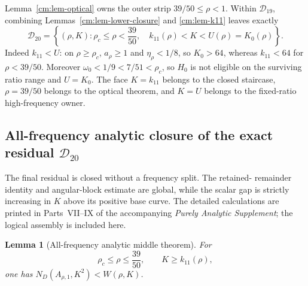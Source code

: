 \documentclass[11pt]{article}
\numberwithin{equation}{section}
\newtheorem{lemma}[theorem]{Lemma}
\theoremstyle{definition}
\theoremstyle{remark}
\begin{document}
\iffalse
Lemma~\ref{cm:lem-optical} owns the outer strip
\(39/50\leq\rho<1\).  Within \(\mathcal D_{19}\), combining
Lemmas~\ref{cm:lem-lower-closure} and \ref{cm:lem-k11} leaves exactly
\begin{equation}
 \boxed{
 \mathcal D_{20}=
 \left\{(\rho,K):\rho_c\leq\rho<\frac{39}{50},\quad
 k_{11}(\rho)<K<U(\rho)=K_0(\rho)\right\}.}
 \label{cm:eq-D20}
\end{equation}
Indeed \(k_{11}<U\): on \(\rho\geq\rho_c\),
\(a_\rho\geq1\) and \(\eta_\rho<1/8\), so \(K_0>64\), whereas
\(k_{11}<64\) for \(\rho<39/50\).  Moreover
\(\omega_0<1/9<7/51<\rho_c\), so \(H_0\) is not eligible on the
surviving ratio range and \(U=K_0\).  The face \(K=k_{11}\) belongs to the closed
staircase, \(\rho=39/50\) belongs to the optical theorem, and \(K=U\)
belongs to the fixed-ratio high-frequency owner.

\subsection{All-frequency analytic closure of the exact residual
\texorpdfstring{\(\mathcal D_{20}\)}{D20}}

The final residual is closed without a frequency split.  The retained-
remainder identity and angular-block estimate are global, while the scalar
gap is strictly increasing in \(K\) above its positive base curve.  The
detailed calculations are printed in Parts~VII--IX of the accompanying
\emph{Purely Analytic Supplement}; the logical assembly is included here.

\begin{lemma}[All-frequency analytic middle theorem]
\label{cm:lem-compact-certificate}
For
\[
 \rho_c\leq\rho\leq\frac{39}{50},
 \qquad
 K\geq k_{11}(\rho),
\]
one has \(N_D(A_{\rho,1},K^2)<W(\rho,K)\).
\end{lemma}
\end{document}
